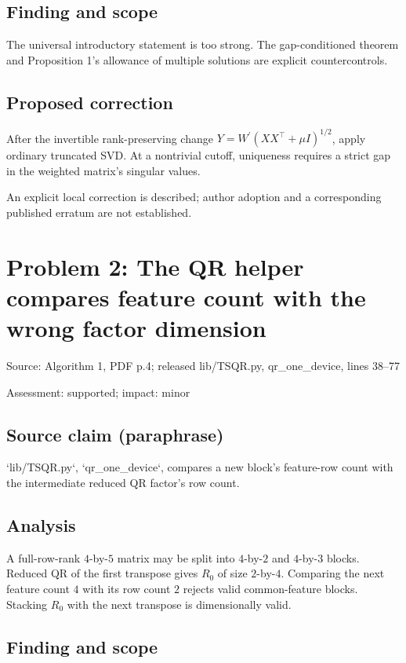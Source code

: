 \documentclass[11pt]{article}
\begin{document}
\subsection*{Finding and scope}

The universal introductory statement is too strong. The gap-conditioned theorem and Proposition 1’s allowance of multiple solutions are explicit countercontrols.

\subsection*{Proposed correction}

After the invertible rank-preserving change \(Y=W^\prime(XX^\top+\mu I)^{1/2}\), apply ordinary truncated SVD. At a nontrivial cutoff, uniqueness requires a strict gap in the weighted matrix’s singular values.

An explicit local correction is described; author adoption and a corresponding published erratum are not established.

\section*{Problem 2: The QR helper compares feature count with the wrong factor dimension}

Source: Algorithm 1, PDF p.4; released lib/TSQR.py, qr\_one\_device, lines 38–77

Assessment: supported; impact: minor

\subsection*{Source claim (paraphrase)}

`lib/TSQR.py`, `qr\_one\_device`, compares a new block’s feature-row count with the intermediate reduced QR factor’s row count.

\subsection*{Analysis}

A full-row-rank \(4\)-by-\(5\) matrix may be split into \(4\)-by-\(2\) and \(4\)-by-\(3\) blocks. Reduced QR of the first transpose gives \(R_0\) of size \(2\)-by-\(4\). Comparing the next feature count \(4\) with its row count \(2\) rejects valid common-feature blocks. Stacking \(R_0\) with the next transpose is dimensionally valid.

\subsection*{Finding and scope}
\end{document}
